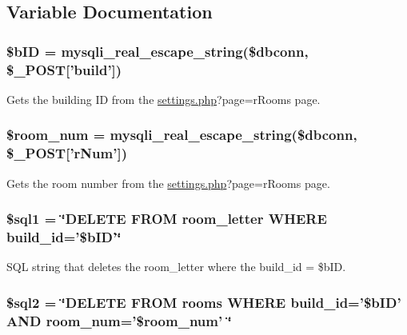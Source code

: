 \subsection{\-Variable \-Documentation}
\hypertarget{rmRooms_8php_ae8be3ef9b83c4349916cb3e11ea81f9d}{
\subsubsection[{\$b\-I\-D}]{\setlength{\rightskip}{0pt plus 5cm}\$b\-I\-D = mysqli\-\_\-real\-\_\-escape\-\_\-string(\$dbconn, \$\-\_\-\-P\-O\-S\-T\mbox{[}'build'\mbox{]})}}\label{rmRooms_8php_ae8be3ef9b83c4349916cb3e11ea81f9d}
\-Gets the building \-I\-D from the \hyperlink{settings_8php}{settings.\-php}?page=r\-Rooms page. \hypertarget{rmRooms_8php_ac8f3b2b9a28b7619de496a616ba2de94}{
\subsubsection[{\$room\-\_\-num}]{\setlength{\rightskip}{0pt plus 5cm}\$room\-\_\-num = mysqli\-\_\-real\-\_\-escape\-\_\-string(\$dbconn, \$\-\_\-\-P\-O\-S\-T\mbox{[}'r\-Num'\mbox{]})}}\label{rmRooms_8php_ac8f3b2b9a28b7619de496a616ba2de94}
\-Gets the room number from the \hyperlink{settings_8php}{settings.\-php}?page=r\-Rooms page. \hypertarget{rmRooms_8php_afe172836ca3d0c604d5bf0378508f614}{
\subsubsection[{\$sql1}]{\setlength{\rightskip}{0pt plus 5cm}\$sql1 = \char`\"{}\-D\-E\-L\-E\-T\-E \-F\-R\-O\-M room\-\_\-letter \-W\-H\-E\-R\-E build\-\_\-id='\$b\-I\-D'\char`\"{}}}\label{rmRooms_8php_afe172836ca3d0c604d5bf0378508f614}
\-S\-Q\-L string that deletes the room\-\_\-letter where the build\-\_\-id = \$b\-I\-D. \hypertarget{rmRooms_8php_a1ad0ffe3fa0755e56a1a6bb40c232b8a}{
\subsubsection[{\$sql2}]{\setlength{\rightskip}{0pt plus 5cm}\$sql2 = \char`\"{}\-D\-E\-L\-E\-T\-E \-F\-R\-O\-M rooms \-W\-H\-E\-R\-E build\-\_\-id='\$b\-I\-D' \-A\-N\-D room\-\_\-num='\$room\-\_\-num' \char`\"{}}}\label{rmRooms_8php_a1ad0ffe3fa0755e56a1a6bb40c232b8a}
